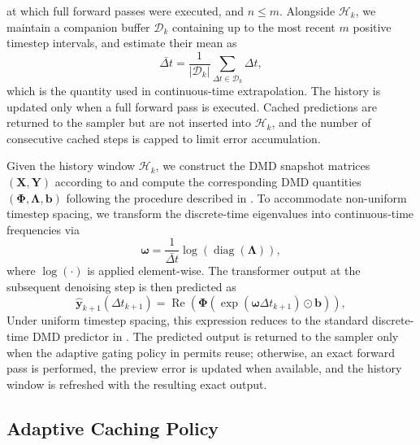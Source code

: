 at which full forward passes were executed, and $n \le m$.
Alongside $\mathcal{H}_k$,
we maintain a companion buffer $\mathcal{D}_k$
containing up to the most recent $m$ positive timestep intervals,
and estimate their mean as
\begin{equation}
\bar{\Delta t}
= \frac{1}{|\mathcal{D}_k|} \sum_{\Delta t \in \mathcal{D}_k} \Delta t,
\label{eq:method:avg-dt}
\end{equation}
which is the quantity used in continuous-time extrapolation.
The history is updated only when a full forward pass is executed.
Cached predictions are returned to the sampler
but are not inserted into $\mathcal{H}_k$,
and the number of consecutive cached steps is capped
to limit error accumulation.

Given the history window $\mathcal{H}_k$,
we construct the DMD snapshot matrices $(\mathbf{X}, \mathbf{Y})$
according to 
and compute the corresponding DMD quantities
$(\mathbf{\Phi}, \boldsymbol{\Lambda}, \mathbf{b})$
following the procedure described in .
To accommodate non-uniform timestep spacing,
we transform the discrete-time eigenvalues
into continuous-time frequencies via
\begin{equation}
\boldsymbol{\omega}
= \frac{1}{\bar{\Delta t}}
\log\left(\operatorname{diag}(\boldsymbol{\Lambda})\right),
\label{eq:method:omega}
\end{equation}
where $\log(\cdot)$ is applied element-wise.
The transformer output at the subsequent denoising step
is then predicted as
\begin{equation}
\hat{\mathbf{y}}_{k+1}(\Delta t_{k+1})
= \operatorname{Re}\!\left(
    \mathbf{\Phi}
    \left(
        \exp(\boldsymbol{\omega} \Delta t_{k+1})
        \odot \mathbf{b}
    \right)
\right),
\label{eq:method:predict}
\end{equation}
Under uniform timestep spacing,
this expression reduces to the standard discrete-time DMD predictor
in .
The predicted output is returned to the sampler
only when the adaptive gating policy in
 permits reuse;
otherwise, an exact forward pass is performed,
the preview error is updated when available,
and the history window is refreshed with the resulting exact output.

\subsection{Adaptive Caching Policy}\label{sub:method:adaptive_caching}

